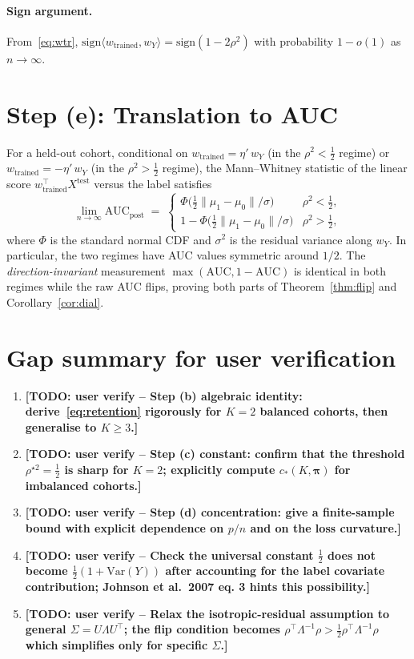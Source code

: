 \documentclass[11pt,a4paper]{article}
\newcommand{\TODO}[1]{\textbf{[TODO: user verify -- #1]}}
\begin{document}
\paragraph{Sign argument.}
From~\eqref{eq:wtr}, $\mathrm{sign}\langle w_{\text{trained}}, w_Y\rangle
= \mathrm{sign}(1-2\rho^{2})$ with probability $1-o(1)$ as $n\to\infty$.

\section{Step (e): Translation to AUC}

For a held-out cohort, conditional on $w_{\text{trained}} = \eta'\, w_Y$
(in the $\rho^2<\tfrac12$ regime) or $w_{\text{trained}}=-\eta'\,w_Y$
(in the $\rho^2>\tfrac12$ regime), the Mann--Whitney statistic of the
linear score $w_{\text{trained}}^{\!\top}X^{\text{test}}$ versus the
label satisfies
\begin{equation}
   \lim_{n\to\infty}\mathrm{AUC}_{\text{post}} \;=\;
   \begin{cases}
     \Phi\!\bigl(\tfrac12\lVert\mu_1-\mu_0\rVert/\sigma\bigr) & \rho^2<\tfrac12,\\[2pt]
     1-\Phi\!\bigl(\tfrac12\lVert\mu_1-\mu_0\rVert/\sigma\bigr) & \rho^2>\tfrac12,
   \end{cases}
\end{equation}
where $\Phi$ is the standard normal CDF and $\sigma^2$ is the residual
variance along $w_Y$.  In particular, the two regimes have AUC values
symmetric around $1/2$.  The \emph{direction-invariant} measurement
$\max(\mathrm{AUC},1-\mathrm{AUC})$ is identical in both regimes while
the raw AUC flips, proving both parts of Theorem~\ref{thm:flip} and
Corollary~\ref{cor:dial}.

\section{Gap summary for user verification}

\begin{enumerate}
\item \TODO{Step (b) algebraic identity: derive~\eqref{eq:retention}
  rigorously for $K=2$ balanced cohorts, then generalise to $K\ge 3$.}
\item \TODO{Step (c) constant: confirm that the threshold
  $\rho^{\star 2}=\tfrac12$ is sharp for $K=2$; explicitly compute
  $c_\ast(K,\boldsymbol{\pi})$ for imbalanced cohorts.}
\item \TODO{Step (d) concentration: give a finite-sample bound with
  explicit dependence on $p/n$ and on the loss curvature.}
\item \TODO{Check the universal constant $\tfrac12$ does not become
  $\tfrac12(1+\mathrm{Var}(Y))$ after accounting for the label covariate
  contribution; Johnson et al.\ 2007 eq. 3 hints this possibility.}
\item \TODO{Relax the isotropic-residual assumption to general
  $\Sigma=U\Lambda U^{\!\top}$; the flip condition becomes
  $\rho^{\!\top}\Lambda^{-1}\rho>\tfrac12 \rho^{\!\top}\Lambda^{-1}\rho$
  which simplifies only for specific $\Sigma$.}
\end{enumerate}
\end{document}
